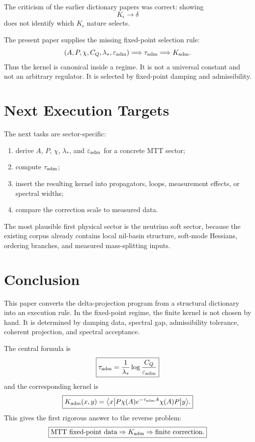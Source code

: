 \documentclass[11pt]{article}
\begin{document}
The criticism of the earlier dictionary papers was correct: showing
\[
K_\epsilon\to\delta
\]
does not identify which \(K_\epsilon\) nature selects.

The present paper supplies the missing fixed-point selection rule:
\[
(A,P,\chi,C_Q,\lambda_\ast,\varepsilon_{\rm adm})
\Longrightarrow
\tau_{\rm adm}
\Longrightarrow
K_{\rm adm}.
\]
Thus the kernel is canonical inside a regime. It is not a universal constant and not an arbitrary regulator. It is selected by fixed-point damping and admissibility.

\section{Next Execution Targets}

The next tasks are sector-specific:

\begin{enumerate}
\item derive \(A\), \(P\), \(\chi\), \(\lambda_\ast\), and \(\varepsilon_{\rm adm}\) for a concrete MTT sector;
\item compute \(\tau_{\rm adm}\);
\item insert the resulting kernel into propagators, loops, measurement effects, or spectral widths;
\item compare the correction scale to measured data.
\end{enumerate}

The most plausible first physical sector is the neutrino soft sector, because the existing corpus already contains local nil-basin structure, soft-mode Hessians, ordering branches, and measured mass-splitting inputs.

\section{Conclusion}

This paper converts the delta-projection program from a structural dictionary into an execution rule. In the fixed-point regime, the finite kernel is not chosen by hand. It is determined by damping data, spectral gap, admissibility tolerance, coherent projection, and spectral acceptance.

The central formula is
\[
\boxed{
\tau_{\rm adm}
=
\frac{1}{\lambda_\ast}\log\frac{C_Q}{\varepsilon_{\rm adm}}
}
\]
and the corresponding kernel is
\[
\boxed{
K_{\rm adm}(x,y)
=
\big\langle x\big|P\chi(A)e^{-\tau_{\rm adm}A}\chi(A)P\big|y\big\rangle.
}
\]
This gives the first rigorous answer to the reverse problem:
\[
\boxed{
\text{MTT fixed-point data}
\Rightarrow
K_{\rm adm}
\Rightarrow
\text{finite correction}.
}
\]
\end{document}
